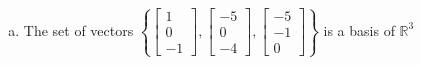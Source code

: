 \begin{exerciseAnswer}
\begin{enumerate}[(a)]
\item The set of vectors \( \left\{ \left[\begin{array}{c}
1 \\
0 \\
-1
\end{array}\right] , \left[\begin{array}{c}
-5 \\
0 \\
-4
\end{array}\right] , \left[\begin{array}{c}
-5 \\
-1 \\
0
\end{array}\right] \right\} \) is a basis of \(\mathbb{R}^3\)
\end{enumerate}
    
\end{exerciseAnswer}
    
